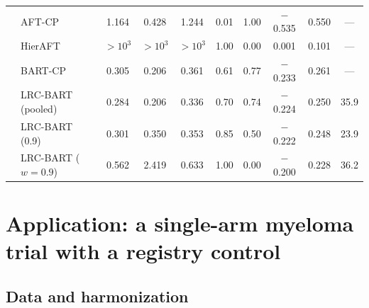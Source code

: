 \documentclass[11pt]{article}
\theoremstyle{definition}
\theoremstyle{plain}
\begin{document}
\begin{longtable}{llcccccccc}
\midrule
{} & AFT-CP & 1.164 & 0.428 & 1.244 & 0.01 & 1.00 & $-$0.535 & 0.550 & --- \\*
& HierAFT & $>\!10^{3}$ & $>\!10^{3}$ & $>\!10^{3}$ & 1.00 & 0.00 & 0.001 & 0.101 & --- \\*
& BART-CP & 0.305 & 0.206 & 0.361 & 0.61 & 0.77 & $-$0.233 & 0.261 & --- \\*
& LRC-BART (pooled) & 0.284 & 0.206 & 0.336 & 0.70 & 0.74 & $-$0.224 & 0.250 & 35.9 \\*
& LRC-BART (0.9) & 0.301 & 0.350 & 0.353 & 0.85 & 0.50 & $-$0.222 & 0.248 & 23.9 \\*
& LRC-BART ($w=0.9$) & 0.562 & 2.419 & 0.633 & 1.00 & 0.00 & $-$0.200 & 0.228 & 36.2 \\
\end{longtable}
\endgroup


\section{Application: a single-arm myeloma trial with a registry control}
\label{sec:application}

\subsection{Data and harmonization}
\label{sec:app_data}
\end{document}
